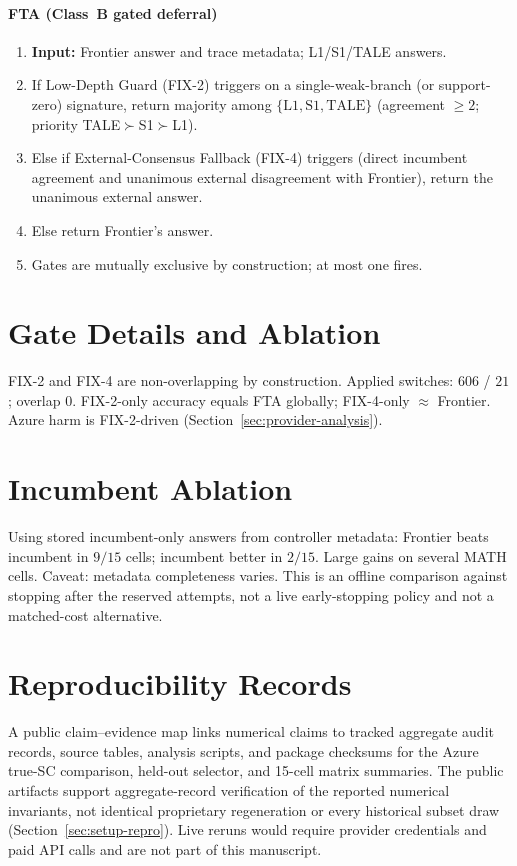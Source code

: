 \paragraph{FTA (Class~B gated deferral)}
\begin{enumerate}
\item \textbf{Input:} Frontier answer and trace metadata; L1/S1/TALE answers.
\item If Low-Depth Guard (FIX-2) triggers on a single-weak-branch (or support-zero) signature,
return majority among $\{\mathrm{L1},\mathrm{S1},\mathrm{TALE}\}$ (agreement $\geq 2$; priority
TALE$\succ$S1$\succ$L1).
\item Else if External-Consensus Fallback (FIX-4) triggers
(direct incumbent agreement and unanimous external disagreement with Frontier), return the
unanimous external answer.
\item Else return Frontier's answer.
\item Gates are mutually exclusive by construction; at most one fires.
\end{enumerate}

\section{Gate Details and Ablation}
\label{app:gates}

FIX-2 and FIX-4 are non-overlapping by construction. Applied switches: $606$ / $21$; overlap $0$.
FIX-2-only accuracy equals FTA globally; FIX-4-only $\approx$ Frontier. Azure harm is FIX-2-driven
(Section~\ref{sec:provider-analysis}).

\section{Incumbent Ablation}
\label{app:incumbent}

Using stored incumbent-only answers from controller metadata: Frontier beats incumbent in $9/15$
cells; incumbent better in $2/15$. Large gains on several MATH cells. Caveat: metadata completeness
varies. This is an offline comparison against stopping after the reserved attempts, not a live
early-stopping policy and not a matched-cost alternative.

\section{Reproducibility Records}
\label{app:artifact-map}

A public claim--evidence map links numerical claims to tracked aggregate audit records, source
tables, analysis scripts, and package checksums for the Azure true-SC comparison, held-out selector,
and 15-cell matrix summaries. The public artifacts support aggregate-record verification of the
reported numerical invariants, not identical proprietary regeneration or every historical subset draw
(Section~\ref{sec:setup-repro}). Live reruns would require provider credentials and paid API calls
and are not part of this manuscript.

